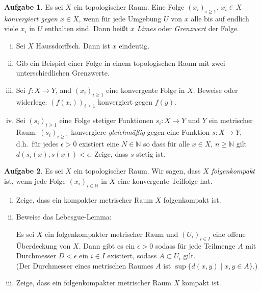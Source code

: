 \documentclass{article}
\theoremstyle{definition}
\newtheorem{aufgabe}{Aufgabe}
\theoremstyle{remark}
\newcommand{\N}{\mathbb{N}}
\begin{document}
\begin{aufgabe}
Es sei $X$ ein topologischer Raum. Eine Folge $(x_i)_{i\geq 1}$, $x_i\in X$ {\itshape konvergiert gegen} $x\in X$, wenn für jede Umgebung $U$ von $x$ alle bis auf endlich viele $x_i$ in $U$ enthalten sind. Dann heißt $x$ \textit{Limes} oder \textit{Grenzwert} der Folge.
\begin{enumerate}[i)]
\item Sei $X$ Haussdorffsch. Dann ist $x$ eindeutig.
\item Gib ein Beispiel einer Folge in einem topologischen Raum mit zwei unterschiedlichen Grenzwerte. 
\item Sei $f\colon X\to Y$, and $(x_i)_{i\geq 1}$ eine konvergente Folge in $X$. Beweise oder widerlege: $(f(x_i))_{i\geq 1}$ konvergiert gegen $f(y)$.
\item Sei $(s_i)_{i\geq 1}$ eine Folge stetiger Funktionen $s_i\colon X\to Y$ und $Y$ ein metrischer Raum. $(s_i)_{i\geq 1}$ konvergiere \textit{gleichmäßig} gegen eine Funktion $s\colon X\to Y$, d.h.\ für jedes $\epsilon>0$ existiert eine $N\in \N$ so dass für alle $x\in X$, $n\geq \N$ gilt $d(s_i(x),s(x))< \epsilon$. Zeige, dass $s$ stetig ist. 
\end{enumerate}

\end{aufgabe}

\begin{aufgabe}
Es sei $X$ ein topologischer Raum. Wir sagen, dass $X$ {\itshape folgenkompakt} ist, wenn jede Folge $(x_i)_{i\in \mathbb N}$ in $X$ eine konvergente Teilfolge hat. 
\begin{enumerate}[i)]
	\item Zeige, dass ein kompakter metrischer Raum $X$ folgenkompakt ist. 
	\item Beweise das Lebesgue-Lemma:
	
	Es sei $X$ ein folgenkompakter metrischer Raum und $(U_i)_{i\in I}$ eine offene Überdeckung von $X$. Dann gibt es ein $\epsilon>0$ sodass für jede Teilmenge $A$ mit Durchmesser $D<\epsilon$ ein $i\in I$ existiert, sodass $A\subset U_i$ gilt.\\
	(Der Durchmesser eines  metrischen Raumes $A$ ist $\sup \{d(x,y) \mid x,y\in A\} $.)
	\item Zeige, dass ein folgenkompakter metrischer Raum $X$ kompakt ist. 
	
\end{enumerate}
\end{aufgabe}
\end{document}
